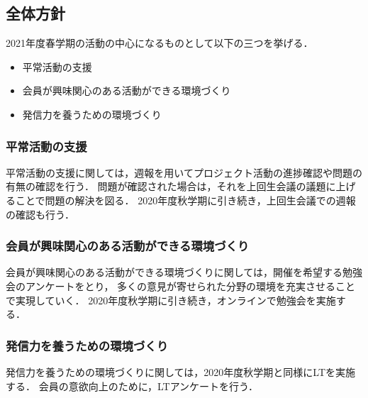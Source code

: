 \subsection*{全体方針}



2021年度春学期の活動の中心になるものとして以下の三つを挙げる．
\begin{itemize}
\item 平常活動の支援
\item 会員が興味関心のある活動ができる環境づくり
\item 発信力を養うための環境づくり
\end{itemize}

\subsubsection*{平常活動の支援}
平常活動の支援に関しては，週報を用いてプロジェクト活動の進捗確認や問題の有無の確認を行う．
問題が確認された場合は，それを上回生会議の議題に上げることで問題の解決を図る．
2020年度秋学期に引き続き，上回生会議での週報の確認も行う．

\subsubsection*{会員が興味関心のある活動ができる環境づくり}
会員が興味関心のある活動ができる環境づくりに関しては，開催を希望する勉強会のアンケートをとり，
多くの意見が寄せられた分野の環境を充実させることで実現していく．
2020年度秋学期に引き続き，オンラインで勉強会を実施する．

\subsubsection*{発信力を養うための環境づくり}
発信力を養うための環境づくりに関しては，2020年度秋学期と同様にLTを実施する．
会員の意欲向上のために，LTアンケートを行う．
